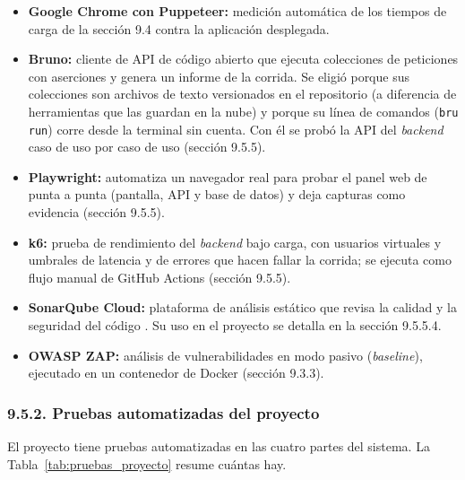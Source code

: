 \begin{itemize}
    \item \textbf{Google Chrome con Puppeteer:} medición automática de los tiempos de carga de la sección 9.4 contra la aplicación desplegada.
    \item \textbf{Bruno:} cliente de API de código abierto que ejecuta colecciones de peticiones con aserciones y genera un informe de la corrida. Se eligió porque sus colecciones son archivos de texto versionados en el repositorio (a diferencia de herramientas que las guardan en la nube) y porque su línea de comandos (\texttt{bru run}) corre desde la terminal sin cuenta. Con él se probó la API del \textit{backend} caso de uso por caso de uso (sección 9.5.5).
    \item \textbf{Playwright:} automatiza un navegador real para probar el panel web de punta a punta (pantalla, API y base de datos) y deja capturas como evidencia (sección 9.5.5).
    \item \textbf{k6:} prueba de rendimiento del \textit{backend} bajo carga, con usuarios virtuales y umbrales de latencia y de errores que hacen fallar la corrida; se ejecuta como flujo manual de GitHub Actions (sección 9.5.5).
    \item \textbf{SonarQube Cloud:} plataforma de análisis estático que revisa la calidad y la seguridad del código \parencite{sonarqubecloud2026}. Su uso en el proyecto se detalla en la sección 9.5.5.4.
    \item \textbf{OWASP ZAP:} análisis de vulnerabilidades en modo pasivo (\textit{baseline}), ejecutado en un contenedor de Docker (sección 9.3.3).
\end{itemize}


\subsubsection{9.5.2. Pruebas automatizadas del proyecto}

El proyecto tiene pruebas automatizadas en las cuatro partes del sistema. La Tabla~\ref{tab:pruebas_proyecto} resume cuántas hay.

